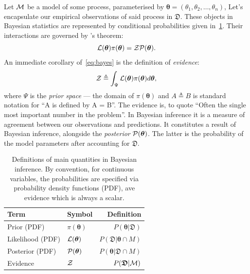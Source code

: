 \documentclass[usenatbib]{mnras}
\begin{document}
Let \({\cal M}\) be a model of some process, parameterised by
\(\bm{\theta} = (\theta_{1}, \theta_{2}, \ldots , \theta_{n})\), Let's
encapsulate our empirical observations of said process in
\(\mathfrak{D}\).  These objects in Bayesian statistics are
represented by conditional probabilities given
in~\cref{table-defs}. Their interactions are governed by
\citeauthor{1763}'s theorem:
\begin{equation}\label{eq:bayes} 
 {\cal L}(\bm{\theta})  \pi (\bm{\theta}) = {\cal Z}  {\cal P} (\bm{\theta}).
\end{equation}
An immediate corollary of~\cref{eq:bayes} is the definition of \emph{evidence}:
\begin{equation}\label{eq:def-z}
 {\cal Z} \triangleq \int_{\Psi} {\cal L}(\bm{\theta}) \pi(\bm{\theta}) d\bm{\theta}, 
\end{equation}
where \(\Psi\) is the \emph{prior space} --- the domain of
\(\pi(\bm{\theta})\) and \(A \triangleq B\) is standard notation for
``A is defined by A = B''. The evidence is, to quote
\cite{importanceOfZ} ``Often the single most important number in the
problem''. In Bayesian inference it is a measure of agreement between
our observations and predictions. It constitutes a result of Bayesian
inference, alongside the \emph{posterior} \({\cal
  P}(\bm{\theta})\). The latter is the probability of the model
parameters after accounting for \(\mathfrak{D}\). 

\begin{table}
  \caption{Definitions of main quantities in Bayesian inference. By
    convention, for continuous variables, the probabilities are
    specified via probability density functions (PDF), ave evidence
    which is always a scalar.  \label{table-defs}}
\centering
\begin{tabular}{llr}
\textbf{\textbf{Term}} & \textbf{\textbf{Symbol}} & \textbf{\textbf{Definition}}\\
\hline
Prior (PDF) & \(\pi(\bm{\theta})\) & \(P ( \bm{\theta}  \vert \bm{ \mathfrak{D}})\) \\
Likelihood (PDF) & \({\cal L}(\bm{\theta})\) & \(P ( \bm{\mathfrak{D}} \vert \bm{\theta} \cap M)\) \\
Posterior (PDF) & \({\cal P}(\bm{\theta})\) & \(P ( \bm{\theta} \vert \bm{\mathfrak{D}} \cap M)\) \\
Evidence & \({\cal Z}\) & \(P ( \bm{\mathfrak{D}} \vert {\cal M})\) \\
\end{tabular}
\end{table}
\end{document}
